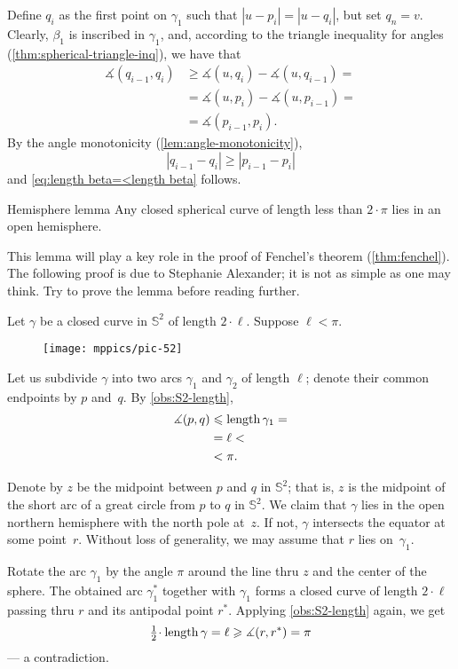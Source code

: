 Define $q_i$ as the first point on $\gamma_1$ such that $|u-p_i|=|u-q_i|$, but set $q_n=v$.
Clearly, $\beta_1$ is inscribed in $\gamma_1$, and, according to the triangle inequality for angles (\ref{thm:spherical-triangle-inq}), we have that 
\begin{align*}
 \measuredangle(q_{i-1},q_i) &\ge  \measuredangle (u, q_i) - \measuredangle ( u , q_{i-1})  =
\\
&= \measuredangle (u,p_i) - \measuredangle (u,p_{i-1}) =
\\
& = \measuredangle(p_{i-1},p_i).
\end{align*}
By the angle monotonicity (\ref{lem:angle-monotonicity}),
\[|q_{i-1}-q_i|\ge|p_{i-1}-p_i|\]
and \ref{eq:length beta=<length beta} follows.
\qeds

\begin{thm}{Hemisphere lemma}\label{lem:hemisphere}
Any closed spherical curve of length less than $2\cdot \pi$ lies in an open hemisphere. 
\end{thm}

This lemma will play a key role in the proof of Fenchel's theorem (\ref{thm:fenchel}).
The following proof is due to Stephanie Alexander;
it is not as simple as one may think.
Try to prove the lemma before reading further.

Let $\gamma$ be a closed curve in $\mathbb{S}^2$ of length $2\cdot\ell$.
Suppose $\ell<\pi$.


\begin{wrapfigure}[8]{o}{35mm}
\vskip-0mm
\centering
\texttt{[image: mppics/pic-52]}
\end{wrapfigure}

Let us subdivide $\gamma$ into two arcs $\gamma_1$ and $\gamma_2$ of length $\ell$;
denote their common endpoints by $p$ and~$q$. 
By \ref{obs:S2-length},
\begin{align*}
\measuredangle(p,q)&\leqslant \mathop{\rm length}\nolimits \gamma_1=
\\
&= \ell<
\\
&<\pi.
\end{align*}

Denote by $z$ be the midpoint between $p$ and $q$ in $\mathbb{S}^2$;
that is, $z$ is the midpoint of the short arc of a great circle from $p$ to $q$ in $\mathbb{S}^2$. 
We claim that $\gamma$ lies in the open northern hemisphere with the north pole at~$z$.
If not, $\gamma$ intersects the equator at some point~$r$.
Without loss of generality, we may assume that $r$ lies on~$\gamma_1$. 

Rotate the arc $\gamma_1$ by the angle $\pi$ around the line thru $z$ and the center of the sphere.
The obtained arc $\gamma_1^{*}$ together with $\gamma_1$ forms a closed curve of length $2\cdot \ell$ passing thru $r$ and its antipodal point $r^{*}$.
Applying \ref{obs:S2-length} again, we get
\[\tfrac12\cdot\length \gamma=\ell\ge \measuredangle(r,r^{*})=\pi\] 
--- a contradiction.
\qeds

